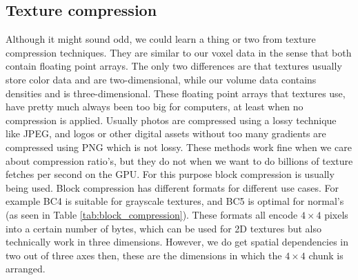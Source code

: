 \subsection{Texture compression} \label{related_work:texture_compression}
Although it might sound odd, we could learn a thing or two from texture compression techniques. They are similar to our voxel data in the sense that both contain floating point arrays. The only two differences are that textures usually store color data and are two-dimensional, while our volume data contains densities and is three-dimensional. These floating point arrays that textures use, have pretty much always been too big for computers, at least when no compression is applied. Usually photos are compressed using a lossy technique like JPEG, and logos or other digital assets without too many gradients are compressed using PNG which is not lossy. These methods work fine when we care about compression ratio's, but they do not when we want to do billions of texture fetches per second on the GPU. For this purpose block compression is usually being used\cite{BlockCompression}. Block compression has different formats for different use cases. For example BC4 is suitable for grayscale textures, and BC5 is optimal for normal's (as seen in Table \ref{tab:block_compression}). These formats all encode $4\times 4$ pixels into a certain number of bytes, which can be used for 2D textures but also technically work in three dimensions. However, we do get spatial dependencies in two out of three axes then, these are the dimensions in which the $4\times 4$ chunk is arranged.


